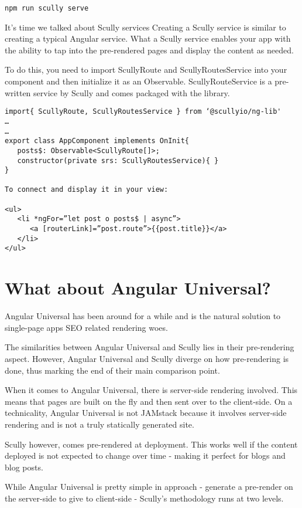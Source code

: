 \begin{verbatim}
npm run scully serve
\end{verbatim}

It's time we talked about Scully services
Creating a Scully service is similar to creating a typical Angular service. What a Scully service enables your app with the ability to tap into the pre-rendered pages and display the content as needed.

To do this, you need to import ScullyRoute and ScullyRoutesService into your component and then initialize it as an Observable. ScullyRouteService is a pre-written service by Scully and comes packaged with the library.

\begin{lstlisting}
import{ ScullyRoute, ScullyRoutesService } from ‘@scullyio/ng-lib'
…
…
export class AppComponent implements OnInit{
   posts$: Observable<ScullyRoute[]>;
   constructor(private srs: ScullyRoutesService){ }
}

To connect and display it in your view:

<ul>
   <li *ngFor=”let post o posts$ | async”>
      <a [routerLink]=”post.route”>{{post.title}}</a>
   </li>
</ul>
\end{lstlisting}

\section{What about Angular Universal?}
Angular Universal has been around for a while and is the natural solution to single-page apps SEO related rendering woes. 

The similarities between Angular Universal and Scully lies in their pre-rendering aspect. However, Angular Universal and Scully diverge on how pre-rendering is done, thus marking the end of their main comparison point.

When it comes to Angular Universal, there is server-side rendering involved. This means that pages are built on the fly and then sent over to the client-side. On a technicality, Angular Universal is not JAMstack because it involves server-side rendering and is not a truly statically generated site. 

Scully however, comes pre-rendered at deployment. This works well if the content deployed is not expected to change over time - making it perfect for blogs and blog posts.

While Angular Universal is pretty simple in approach - generate a pre-render on the server-side to give to client-side - Scully's methodology runs at two levels.

